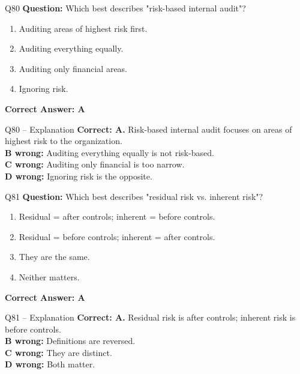 \documentclass[aspectratio=169,10pt]{beamer}
\begin{document}
	\begin{frame}[t]{Q80}
		\small
		\textbf{Question:} Which best describes "risk-based internal audit"?
		\begin{enumerate}[label=\Alph*.,itemsep=1pt,topsep=2pt]
			\item Auditing areas of highest risk first.
			\item Auditing everything equally.
			\item Auditing only financial areas.
			\item Ignoring risk.
		\end{enumerate}
		\vspace{4pt}
		\textbf{Correct Answer: A}
	\end{frame}
	
	\begin{frame}[t]{Q80 -- Explanation}
		\small
		\textbf{Correct: A.} Risk-based internal audit focuses on areas of highest risk to the organization. \\[4pt]
		\textbf{B wrong:} Auditing everything equally is not risk-based. \\[2pt]
		\textbf{C wrong:} Auditing only financial is too narrow. \\[2pt]
		\textbf{D wrong:} Ignoring risk is the opposite.
	\end{frame}
	
	\begin{frame}[t]{Q81}
		\small
		\textbf{Question:} Which best describes "residual risk vs. inherent risk"?
		\begin{enumerate}[label=\Alph*.,itemsep=1pt,topsep=2pt]
			\item Residual = after controls; inherent = before controls.
			\item Residual = before controls; inherent = after controls.
			\item They are the same.
			\item Neither matters.
		\end{enumerate}
		\vspace{4pt}
		\textbf{Correct Answer: A}
	\end{frame}
	
	\begin{frame}[t]{Q81 -- Explanation}
		\small
		\textbf{Correct: A.} Residual risk is after controls; inherent risk is before controls. \\[4pt]
		\textbf{B wrong:} Definitions are reversed. \\[2pt]
		\textbf{C wrong:} They are distinct. \\[2pt]
		\textbf{D wrong:} Both matter.
	\end{frame}
	
\end{document}
